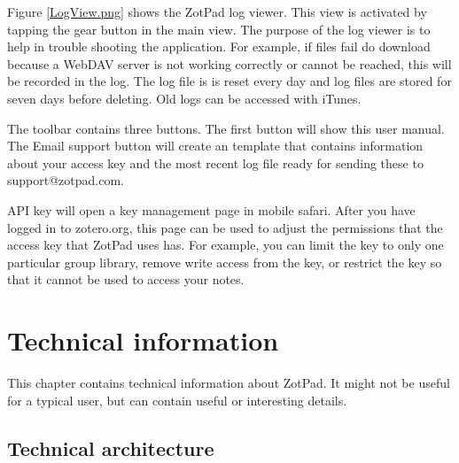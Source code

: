 \documentclass[oneside, openany, 12pt]{tufte-book}
\newcommand{\iphone}[1]{#1}
\newcommand{\ipad}[1]{}
\newcommand{\image}[2]{
	\center
	\fbox{\texttt{[image: images/iPhone/\{\#2]}}}

	\refstepcounter{figure}
	\smallskip\noindent\small Figure \thefigure: #1
	\label{#2}
	}
\newcommand{\iphone}[1]{}
\newcommand{\ipad}[1]{#1}
\newcommand{\image}[2]{
	\caption{#1}
	\label{#2}
	\fbox{\texttt{[image: images/iPad/\{\#2]}}}
	}
\begin{document}
Figure \ref{LogView.png} shows the ZotPad log viewer. This view is activated by tapping the gear button in the main view. The purpose of the log viewer is to help in trouble shooting the application. For example, if files fail do download because a WebDAV server is not working correctly or cannot be reached, this will be recorded in the log. The log file is is reset every day and log files are stored for seven days before deleting. Old logs can be accessed with iTunes. 

\begin{figure}
\image{ZotPad log viewer}{LogView.png}
\end{figure}

The toolbar contains \ipad{four}\iphone{three }buttons. The first button will show this user manual\ipad{ and the second button will open the support pages on the ZotPad website. These pages contain the most up to date documentation and are complementary to this user manual}. The Email support button will create an template that contains information about your access key and the most recent log file ready for sending these to support@zotpad.com.

\ipad{Manage }API key will open a key management page in mobile safari. After you have logged in to zotero.org, this page can be used to adjust the permissions that the access key that ZotPad uses has. For example, you can limit the key to only one particular group library, remove write access from the key, or restrict the key so that it cannot be used to access your notes.

\chapter{Technical information}

This chapter contains technical information about ZotPad. It might not be useful for a typical user, but can contain useful or interesting details. 

	\section{Technical architecture}
\label{sect:architecture}
\end{document}
